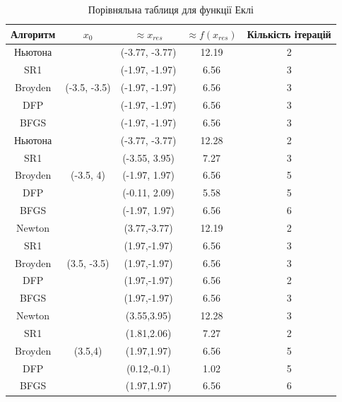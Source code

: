 \clearpage
\begin{table}[ht!]
    \centering
    \begin{tabular}{|c|c|c|c|c|}
        \hline
        \textbf{Алгоритм} & $x_{0}$ & $\approx x_{res}$ & $\approx f(x_{res})$ & \textbf{Кількість ітерацій}  \\
        \hline
        Ньютона & \multirow{5}{*}{(-3.5, -3.5)} & (-3.77, -3.77) & 12.19 & 2 \\
        \cline{1-1} \cline{3-5}
        SR1 & & (-1.97, -1.97) & 6.56 & 3 \\
        \cline{1-1} \cline{3-5}
        Broyden & & (-1.97, -1.97) & 6.56 & 3 \\
        \cline{1-1} \cline{3-5}
        DFP & & (-1.97, -1.97) & 6.56 & 3 \\
        \cline{1-1} \cline{3-5}
        BFGS & & (-1.97, -1.97) & 6.56 & 3 \\
        \hline
        Ньютона & \multirow{5}{*}{(-3.5, 4)} & (-3.77, -3.77) & 12.28 & 2 \\
        \cline{1-1} \cline{3-5}
        SR1 & & (-3.55, 3.95) & 7.27 & 3 \\
        \cline{1-1} \cline{3-5}
        Broyden & & (-1.97, 1.97) & 6.56 & 5 \\
        \cline{1-1} \cline{3-5}
        DFP & & (-0.11, 2.09) & 5.58 & 5 \\
        \cline{1-1} \cline{3-5}
        BFGS & & (-1.97, 1.97) & 6.56 & 6 \\
        \hline
        Newton & \multirow{5}{*}{(3.5, -3.5)} & (3.77,-3.77) & 12.19 & 2 \\
        \cline{1-1} \cline{3-5}
        SR1 & & (1.97,-1.97) & 6.56 & 3 \\
        \cline{1-1} \cline{3-5}
        Broyden & & (1.97,-1.97) & 6.56 & 3 \\
        \cline{1-1} \cline{3-5}
        DFP & & (1.97,-1.97) & 6.56 & 2 \\
        \cline{1-1} \cline{3-5}
        BFGS & & (1.97,-1.97) & 6.56 & 3 \\
        \hline
        Newton & \multirow{5}{*}{(3.5,4)} & (3.55,3.95) & 12.28 & 3 \\
        \cline{1-1} \cline{3-5}
        SR1 & & (1.81,2.06) & 7.27 & 2 \\
        \cline{1-1} \cline{3-5}
        Broyden & & (1.97,1.97) & 6.56 & 5 \\
        \cline{1-1} \cline{3-5}
        DFP & & (0.12,-0.1) & 1.02 & 5 \\
        \cline{1-1} \cline{3-5}
        BFGS & & (1.97,1.97) & 6.56 & 6 \\
        \hline
    \end{tabular}
    \caption{Порівняльна таблиця для функції Еклі}
\end{table}
